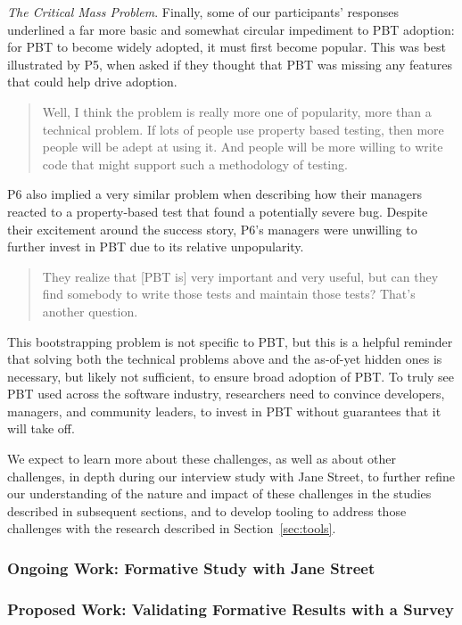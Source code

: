 \textit{The Critical Mass Problem}.
Finally, some of our participants' responses underlined a far more basic and
somewhat circular impediment to PBT adoption: for PBT to become widely adopted, it
must first become popular. This was best illustrated by P5,
when asked if they thought that PBT was missing any features that could help
drive adoption.
\begin{quote}
  Well, I think the problem is really more one of popularity, more than a
  technical problem. If lots of people use property based testing, then more
  people will be adept at using it.  And people will be more willing to write
  code that might support such a methodology of testing.
\end{quote}

P6 also implied a very similar problem when describing
how their managers reacted to a property-based test that found a potentially
severe bug. Despite their excitement around the success story, P6's
managers were unwilling to further invest in PBT due to its relative
unpopularity.
\begin{quote}
  They realize that [PBT is] very important and very useful, but can they find
  somebody to write those tests and maintain those tests? That's another
  question.
\end{quote}

This bootstrapping problem is not specific to PBT, but this is a helpful
reminder that solving both the
technical problems above and the as-of-yet hidden ones is necessary, but
likely not sufficient, to ensure broad adoption of PBT. To truly see PBT used across the software
industry, researchers need to convince developers, managers, and community
leaders, to invest in PBT without guarantees that it will take off.

We expect to learn more about these challenges, as well as about other challenges,
in depth during our interview study with Jane Street, to further refine our
understanding of the nature and impact of these challenges in the studies
described in subsequent sections, and to develop tooling to address
those challenges with the research described in Section~\ref{sec:tools}.

\subsubsection{Ongoing Work: Formative Study with Jane Street}

\subsubsection{Proposed Work: Validating Formative Results with a Survey}

